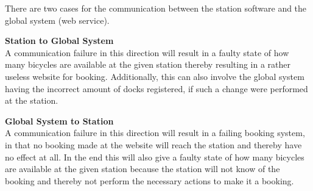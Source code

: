\begin{description}[style=nextline]
There are two cases for the communication between the station software and the global system (web service).

\textbf{Station to Global System}\\
A communication failure in this direction will result in a faulty state of how many bicycles are available at the given station thereby resulting in a rather useless website for booking.
Additionally, this can also involve the global system having the incorrect amount of docks registered, if such a change were performed at the station.

\textbf{Global System to Station}\\
A communication failure in this direction will result in a failing booking system, in that no booking made at the website will reach the station and thereby have no effect at all.
In the end this will also give a faulty state of how many bicycles are available at the given station because the station will not know of the booking and thereby not perform the necessary actions to make it a booking.

\end{description}

